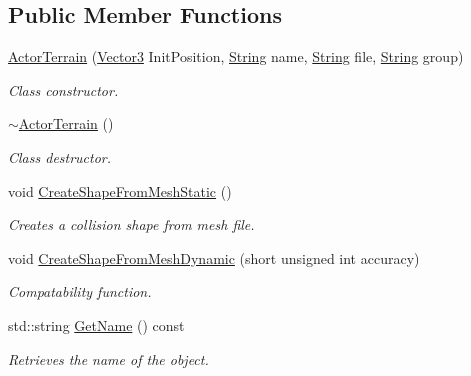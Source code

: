\subsection*{Public Member Functions}
\begin{DoxyCompactItemize}
\item 
\hyperlink{classphys_1_1ActorTerrain_af0d3b88d5ee409c5451bb13a20254176}{ActorTerrain} (\hyperlink{classphys_1_1Vector3}{Vector3} InitPosition, \hyperlink{namespacephys_aa03900411993de7fbfec4789bc1d392e}{String} name, \hyperlink{namespacephys_aa03900411993de7fbfec4789bc1d392e}{String} file, \hyperlink{namespacephys_aa03900411993de7fbfec4789bc1d392e}{String} group)
\begin{DoxyCompactList}\small\item\em Class constructor. \item\end{DoxyCompactList}\item 
\hyperlink{classphys_1_1ActorTerrain_af6ef2e3694b7afe0b59cfa0909c0490c}{$\sim$ActorTerrain} ()
\begin{DoxyCompactList}\small\item\em Class destructor. \item\end{DoxyCompactList}\item 
void \hyperlink{classphys_1_1ActorTerrain_a2403c40af6799e67c9aff1520b02dc0b}{CreateShapeFromMeshStatic} ()
\begin{DoxyCompactList}\small\item\em Creates a collision shape from mesh file. \item\end{DoxyCompactList}\item 
void \hyperlink{classphys_1_1ActorTerrain_aa5f545a73da45ab219121c4b2cd0ded9}{CreateShapeFromMeshDynamic} (short unsigned int accuracy)
\begin{DoxyCompactList}\small\item\em Compatability function. \item\end{DoxyCompactList}\item 
std::string \hyperlink{classphys_1_1ActorTerrain_a08f306ae189e55d780dcaa2c43d7b6eb}{GetName} () const 
\begin{DoxyCompactList}\small\item\em Retrieves the name of the object. \item\end{DoxyCompactList}\item 

\end{DoxyCompactItemize}
